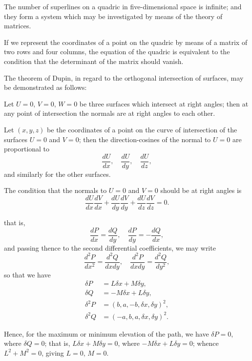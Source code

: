 \documentclass[11pt,a4paper]{book}
\providecommand{\between}{,}
\begin{document}
The number of superlines on a quadric in five-dimensional space is infinite; and they form a system which may be investigated by means of the theory of matrices.

If we represent the coordinates of a point on the quadric by means of a matrix of two rows and four columns, the equation of the quadric is equivalent to the condition that the determinant of the matrix should vanish.

\newpage


The theorem of Dupin, in regard to the orthogonal intersection of surfaces, may be demonstrated as follows:

Let $U = 0$, $V = 0$, $W = 0$ be three surfaces which intersect at right angles; then at any point of intersection the normals are at right angles to each other.

Let $(x, y, z)$ be the coordinates of a point on the curve of intersection of the surfaces $U = 0$ and $V = 0$; then the direction-cosines of the normal to $U = 0$ are proportional to
\[
\frac{dU}{dx}, \quad \frac{dU}{dy}, \quad \frac{dU}{dz},
\]
and similarly for the other surfaces.

The condition that the normals to $U = 0$ and $V = 0$ should be at right angles is
\[
\frac{dU}{dx}\frac{dV}{dx} + \frac{dU}{dy}\frac{dV}{dy} + \frac{dU}{dz}\frac{dV}{dz} = 0.
\]

\newpage

that is,
\[
\frac{dP}{dx} = \frac{dQ}{dy}, \quad \frac{dP}{dy} = -\frac{dQ}{dx},
\]
and passing thence to the second differential coefficients, we may write
\[
\frac{d^2P}{dx^2} = \frac{d^2Q}{dxdy}, \quad \frac{d^2P}{dxdy} = \frac{d^2Q}{dy^2},
\]
so that we have
\begin{align*}
\delta P &= L\delta x + M\delta y, \\
\delta Q &= -M\delta x + L\delta y, \\
\delta^2 P &= (b, a, -b \between \delta x, \delta y)^2, \\
\delta^2 Q &= (-a, b, a \between \delta x, \delta y)^2.
\end{align*}

Hence, for the maximum or minimum elevation of the path, we have $\delta P = 0$, where $\delta Q = 0$; that is, $L\delta x + M\delta y = 0$, where $-M\delta x + L\delta y = 0$; whence $L^2 + M^2 = 0$, giving $L = 0$, $M = 0$.
\end{document}
